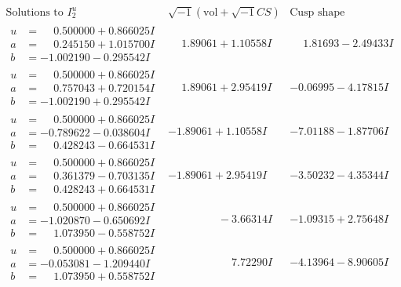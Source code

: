 \documentclass[1p]{elsarticle_modified}
\theoremstyle{definition}
\newcommand{\I}{\sqrt{-1}}
\begin{document}
$$\begin{array}{c|c|c}  
\text{Solutions to }I^u_{2}& \I (\text{vol} + \sqrt{-1}CS) & \text{Cusp shape}\\
 \hline 
\begin{aligned}
u &= \phantom{-}0.500000 + 0.866025 I \\
a &= \phantom{-}0.245150 + 1.015700 I \\
b &= -1.002190 - 0.295542 I\end{aligned}
 & \phantom{-}1.89061 + 1.10558 I & \phantom{-}1.81693 - 2.49433 I \\ \hline\begin{aligned}
u &= \phantom{-}0.500000 + 0.866025 I \\
a &= \phantom{-}0.757043 + 0.720154 I \\
b &= -1.002190 + 0.295542 I\end{aligned}
 & \phantom{-}1.89061 + 2.95419 I & -0.06995 - 4.17815 I \\ \hline\begin{aligned}
u &= \phantom{-}0.500000 + 0.866025 I \\
a &= -0.789622 - 0.038604 I \\
b &= \phantom{-}0.428243 - 0.664531 I\end{aligned}
 & -1.89061 + 1.10558 I & -7.01188 - 1.87706 I \\ \hline\begin{aligned}
u &= \phantom{-}0.500000 + 0.866025 I \\
a &= \phantom{-}0.361379 - 0.703135 I \\
b &= \phantom{-}0.428243 + 0.664531 I\end{aligned}
 & -1.89061 + 2.95419 I & -3.50232 - 4.35344 I \\ \hline\begin{aligned}
u &= \phantom{-}0.500000 + 0.866025 I \\
a &= -1.020870 - 0.650692 I \\
b &= \phantom{-}1.073950 - 0.558752 I\end{aligned}
 & \phantom{-0.000000 } -3.66314 I & -1.09315 + 2.75648 I \\ \hline\begin{aligned}
u &= \phantom{-}0.500000 + 0.866025 I \\
a &= -0.053081 - 1.209440 I \\
b &= \phantom{-}1.073950 + 0.558752 I\end{aligned}
 & \phantom{-0.000000 -}7.72290 I & -4.13964 - 8.90605 I \\ \hline\begin{aligned}

\end{aligned}
\end{array}$$
\end{document}
